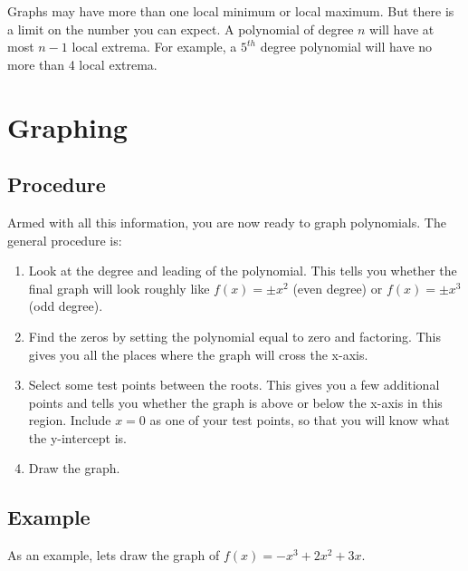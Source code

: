 \documentclass[fleqn,addpoints]{exam}
\begin{document}
Graphs may have more than one local minimum or local maximum.  But there is a limit on the number you can expect.  A
polynomial of degree $n$ will have at most $n-1$ local extrema.  For example, a $5^{th}$ degree polynomial will have no
more than 4 local extrema.

\section{Graphing}

\subsection{Procedure}
Armed with all this information, you are now ready to graph polynomials.  The general procedure is:
\begin{enumerate}

\item Look at the degree and leading of the polynomial.  This tells you whether the final graph will look roughly like $f(x) = \pm
  x^2$ (even degree) or $f(x) = \pm x^3$ (odd degree).

\item Find the zeros by setting the polynomial equal to zero and factoring.  This gives you all the places where the
  graph will cross the x-axis.

\item Select some test points between the roots.  This gives you a few additional points and tells you whether the graph
  is above or below the x-axis in this region.  Include $x=0$ as one of your test points, so that you will know what the
  y-intercept is.

\item Draw the graph.
\end{enumerate}

\subsection{Example}

As an example, lets draw the graph of $f(x) = -x^3 + 2x^2 + 3x$.
\end{document}
